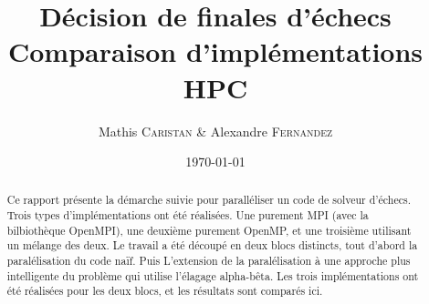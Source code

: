 \documentclass[12pt]{article}
\title{Décision de finales d'échecs\\ Comparaison d'implémentations \\ HPC} %
\author{Mathis \textsc{Caristan} \& Alexandre \textsc{Fernandez}} %
\date{\today} %
\begin{document}
\maketitle %

\begin{abstract}
    Ce rapport présente la démarche suivie pour paralléliser un code de solveur d'échecs.
    Trois types d'implémentations ont été réalisées.
    Une purement MPI (avec la bilbiothèque OpenMPI), une deuxième purement OpenMP,
    et une troisième utilisant un mélange des deux.
    Le travail a été découpé en deux blocs distincts, tout d'abord la paralélisation
    du code \og naïf\fg. Puis L'extension de la paralélisation à une approche plus
    intelligente du problème qui utilise \og l'élagage alpha-bêta\fg.
    Les trois implémentations ont été réalisées pour les deux blocs, et les résultats
    sont comparés ici.
\end{abstract}

\end{document}
